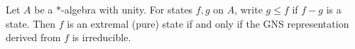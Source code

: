 Let $A$ be a $*$-algebra with unity. For states $f, g$ on $A$, write $g \leq f$ if $f - g$ is a state. Then $f$ is an extremal (pure) state if and only if the GNS representation derived from $f$ is irreducible.
